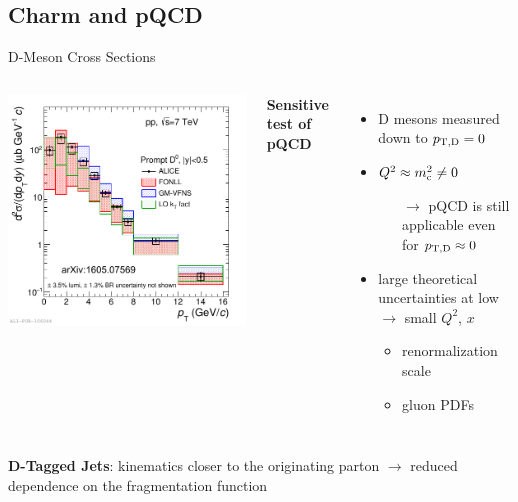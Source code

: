 \documentclass[xcolor={usenames,dvipsnames}]{beamer}
\begin{document}
\subsection{Charm and pQCD}
\begin{frame}{D-Meson Cross Sections}
\begin{columns}
\includegraphics[width=\textwidth]{img/ALICE_D0Meson}

\textbf{\alert{Sensitive test of pQCD}}
\begin{itemize}
\item D mesons measured down to \alert{$p_{\mathrm{T,D}}=0$~\GeVc}
\item \alert{$Q^2\approx m_{\rm c}^2 \neq 0$}
\begin{itemize}
\item[$\rightarrow$] pQCD is still applicable even for $p_{\mathrm{T,D}}\approx0$~\GeVc
\end{itemize}
\item large theoretical uncertainties at low \ptd $\rightarrow$ \alert{small $Q^2$, $x$}
\begin{itemize}
\item renormalization scale
\item gluon PDFs
\end{itemize}
\end{itemize}
\end{columns}
\medskip
\alert{\textbf{D-Tagged Jets}: kinematics closer to the originating parton} $\rightarrow$ reduced dependence on the fragmentation function
\end{frame}
\end{document}

